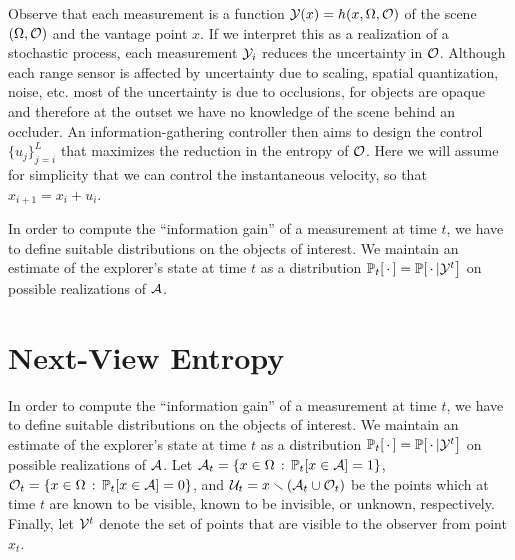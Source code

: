 Observe that each measurement is a
function $\mathcal{Y}(x) = h(x, \Omega, \mathcal{O})$ of the scene $(\Omega, \mathcal{O})$ and the vantage point $x$.
If we interpret
this as a realization of a stochastic process, each measurement
$\mathcal{Y}_i$ reduces the uncertainty in $\mathcal{O}$. Although each
range sensor is affected by uncertainty due to scaling,
spatial quantization, noise, etc. most of the uncertainty
is due to occlusions, for objects are opaque and therefore 
at the outset we have no knowledge of the scene behind 
an occluder. An information-gathering controller
then aims to design the control $\{u_j\}_{j=i}^L$ that maximizes
the reduction in the entropy of $\mathcal{O}$. Here we will assume
for simplicity that we can control the instantaneous 
velocity, so that $x_{i+1} = x_i + u_i$. 

In order to compute the “information gain” of a measurement at time $t$, we have
to define suitable distributions on the objects of 
interest. 
We maintain an estimate of the explorer's state at time $t$
as a distribution $\mathbb{P}_t[\,\cdot\,] = \mathbb{P}[\,\cdot\,|\mathcal{Y}^t\bigr]$ on possible realizations of $\mathcal{A}$.

\section{Next-View Entropy}


In order to compute the “information gain” of a measurement at time $t$, we have
to define suitable distributions on the objects of 
interest. 
We maintain an estimate of the explorer's state at time $t$
as a distribution $\mathbb{P}_t[\,\cdot\,] = \mathbb{P}[\,\cdot\,|\mathcal{Y}^t\bigr]$ on possible realizations of $\mathcal{A}$.
Let $\mathcal{A}_t = \{x\in \Omega\,:\, \mathbb{P}_t[x\in\mathcal{A}] = 1\}$,
$\mathcal{O}_t = \{x\in \Omega\,:\, \mathbb{P}_t[x\in\mathcal{A}] = 0\}$,
and $\mathcal{U}_t = x \smallsetminus (\mathcal{A}_t \cup \mathcal{O}_t)$
be the points which at time $t$ are 
known to be visible, known to be invisible, or unknown,
respectively.  Finally, let $\mathcal{V}^t$ denote the set of points that are visible to the observer from point $x_t$.

